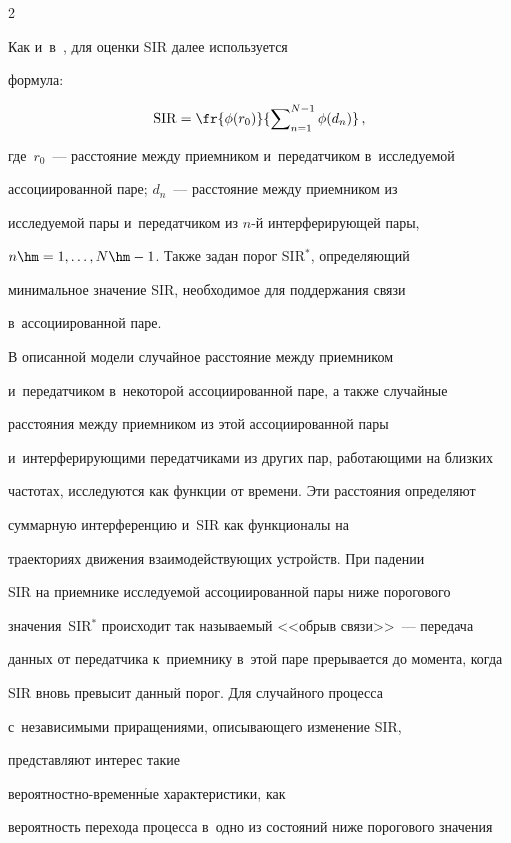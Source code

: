 \begin{multicols}{2}
  


  Как и~в~\cite{14-g1}, для оценки SIR далее используется 


формула:


 $$


 \mathrm{SIR}= \fr{\phi(r_0)}{\sum\nolimits_{n=1}^{N-1} \phi(d_n)}\,,


 $$  


где~$r_0$~--- расстояние между приемником и~передатчиком в~исследуемой 


ассоциированной паре; $d_n$~--- расстояние между приемником из 


исследуемой пары и~передатчиком из $n$-й интерферирующей пары, 


$n\hm=1,\ldots ,N\hm-1$. Также задан порог SIR$^*$, определяющий 


минимальное значение SIR, необходимое для поддержания связи 


в~ассоциированной паре. 


  


  В описанной модели случайное расстояние между приемником 


и~передатчиком в~некоторой ассоциированной паре, а также случайные 


расстояния между приемником из этой ассоциированной пары 


и~интерферирующими передатчиками из других пар, работающими на близких 


частотах, исследуются как функции от времени. Эти расстояния определяют 


суммарную интерференцию и~SIR как функционалы на 


траекториях движения взаимодействующих устройств. При падении  


SIR на приемнике исследуемой ассоциированной пары ниже порогового 


значения~SIR$^*$ происходит так называемый <<обрыв связи>>~--- передача 


данных от передатчика к~приемнику в~этой паре прерывается до момента, когда 


 SIR вновь превысит данный порог. Для случайного процесса 


с~независимыми приращениями, описывающего изменение SIR, 


представляют интерес такие  


ве\-ро\-ят\-ност\-но-вре\-мен\-н$\acute{\mbox{ы}}$е характеристики, как 


вероятность перехода процесса в~одно из состояний ниже порогового значения 



\end{multicols}
